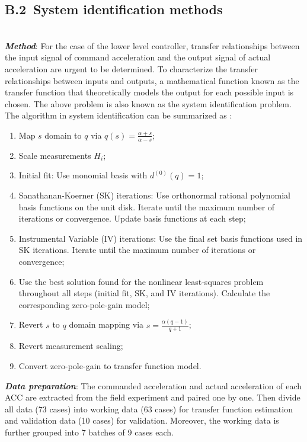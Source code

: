 \documentclass[journal]{IEEEtran}
\begin{document}
\subsection*{B.2~System identification methods}
\label{Section B.2}
~\\
\textbf{\emph{Method}}: For the case of the lower level controller, transfer relationships between the input signal of command acceleration and the output signal of actual acceleration are urgent to be determined. To characterize the transfer relationships between inputs and outputs, a mathematical function known as the transfer function that theoretically models the output for each possible input is chosen. The above problem is also known as the system identification problem. The algorithm in system identification can be summarized as \citep{Ozdemir2017a,Kollar2006a,Ljung1995a}:
\begin{enumerate}
  \item Map $s$ domain to $q$ via $q(s)=\frac{\alpha+s}{\alpha-s}$;
  \item Scale measurements $H_i$;
  \item Initial fit: Use monomial basis with $d^{(0)}(q)=1$;
  \item Sanathanan-Koerner (SK) iterations: Use orthonormal rational polynomial basis functions on the unit disk. Iterate until the maximum number of iterations or convergence. Update basis functions at each step;
  \item Instrumental Variable (IV) iterations: Use the final set basis functions used in SK iterations. Iterate until the maximum number of iterations or convergence;
  \item Use the best solution found for the nonlinear least-squares problem throughout all steps (initial fit, SK, and IV iterations). Calculate the corresponding zero-pole-gain model;
  \item Revert $s$ to $q$ domain mapping via $s=\frac{\alpha(q-1)}{q+1}$;
  \item Revert measurement scaling;
  \item Convert zero-pole-gain to transfer function model.
\end{enumerate}

\textbf{\emph{Data preparation}}: The commanded acceleration and actual acceleration of each ACC are extracted from the field experiment and paired one by one. Then divide all data (73 cases) into working data (63 cases) for transfer function estimation and validation data (10 cases) for validation. Moreover, the working data is further grouped into 7 batches of 9 cases each.
\end{document}
